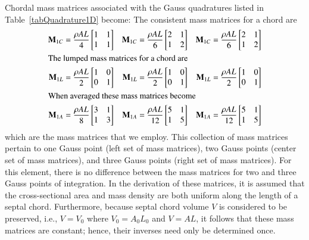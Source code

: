 Chordal mass matrices associated with the Gauss quadratures listed in Table~\ref{tabQuadrature1D} become: The consistent mass matrices for a chord are
\begin{subequations}
\label{massMatrices1D}
\begin{align}
    \mathbf{M}_{1C} & = \frac{\rho A L}{4} 
    \begin{bmatrix} 1 & 1 \\ 1 & 1 \end{bmatrix} & 
    \mathbf{M}_{1C} & = \frac{\rho A L}{6} 
    \begin{bmatrix} 2 & 1 \\ 1 & 2 \end{bmatrix} & 
    \mathbf{M}_{1C} & = \frac{\rho A L}{6} 
    \begin{bmatrix} 2 & 1 \\ 1 & 2 \end{bmatrix} 
    \label{ConsMassMatrix1D} \\
    \intertext{The lumped mass matrices for a chord are}
    \mathbf{M}_{1L} & = \frac{\rho A L}{2} 
    \begin{bmatrix} 1 & 0 \\ 0 & 1 \end{bmatrix} & 
    \mathbf{M}_{1L} & = \frac{\rho A L}{2} 
    \begin{bmatrix} 1 & 0 \\ 0 & 1 \end{bmatrix} & 
    \mathbf{M}_{1L} & = \frac{\rho A L}{2} 
    \begin{bmatrix} 1 & 0 \\ 0 & 1 \end{bmatrix} 
    \label{LumMassMatrix1D} \\
    \intertext{When averaged these mass matrices become}
    \mathbf{M}_{1A} & = \frac{\rho A L}{8} 
    \begin{bmatrix} 3 & 1 \\ 1 & 3 \end{bmatrix} & 
    \mathbf{M}_{1A} & = \frac{\rho A L}{12} 
    \begin{bmatrix} 5 & 1 \\ 1 & 5 \end{bmatrix} & 
    \mathbf{M}_{1A} & = \frac{\rho A L}{12} 
    \begin{bmatrix} 5 & 1 \\ 1 & 5 \end{bmatrix}
    \label{avgMassMatrix1D}
\end{align}
\end{subequations}
which are the mass matrices that we employ.  This collection of mass matrices pertain to one Gauss point (left set of mass matrices), two Gauss points (center set of mass matrices), and three Gauss points (right set of mass matrices).  For this element, there is no difference between the mass matrices for two and three Gauss points of integration.  In the derivation of these matrices, it is assumed that the cross-sectional area and mass density  are both uniform along the length of a septal chord.  Furthermore, because septal chord volume $V$ is considered to be preserved, i.e., $V = V_0$ where $V_0 = A_0 L_0$ and $V = A L$, it follows that these mass matrices are constant; hence, their inverses need only be determined once.

